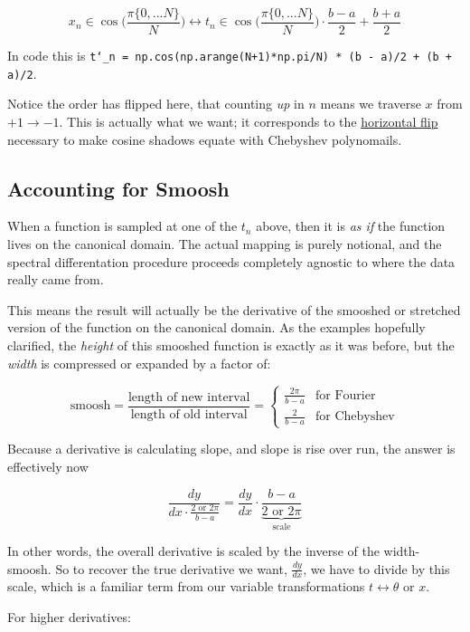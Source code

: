 \documentclass[10pt]{article}
\begin{document}
$$x_n \in \cos\!\Big(\frac{\pi \{0, ... N\}}{N}\Big) \leftrightarrow t_n \in \cos\!\Big(\frac{\pi \{0, ... N\}}{N}\Big) \cdot \frac{b - a}{2} + \frac{b + a}{2}$$

\noindent In code this is \texttt{t\char`_n = np.cos(np.arange(N+1)*np.pi/N) * (b - a)/2 + (b + a)/2}.

Notice the order has flipped here, that counting \textit{up} in $n$ means we traverse $x$ from $+1 \rightarrow -1$. This is actually what we want; it corresponds to the \hyperref[cylinder]{horizontal flip} necessary to make cosine shadows equate with Chebyshev polynomails.

\subsection{Accounting for Smoosh}

When a function is sampled at one of the $t_n$ above, then it is \textit{as if} the function lives on the canonical domain. The actual mapping is purely notional, and the spectral differentation procedure proceeds completely agnostic to where the data really came from.

This means the result will actually be the derivative of the smooshed or stretched version of the function on the canonical domain. As the examples hopefully clarified, the \textit{height} of this smooshed function is exactly as it was before, but the \textit{width} is compressed or expanded by a factor of:

$$\text{smoosh} = \frac{\text{length of new interval}}{\text{length of old interval}} = \begin{cases} \frac{2\pi}{b-a} & \text{for Fourier} \\ \frac{2}{b-a} & \text{for Chebyshev} \end{cases}$$

Because a derivative is calculating slope, and slope is rise over run, the answer is effectively now

$$\frac{dy}{dx \cdot \frac{2 \text{ or } 2\pi}{b-a}} = \frac{dy}{dx} \cdot \underbrace{\frac{b-a}{2 \text{ or } 2\pi}}_{\text{scale}}$$

In other words, the overall derivative is scaled by the inverse of the width-smoosh. So to recover the true derivative we want, $\frac{dy}{dx}$, we have to divide by this scale, which is a familiar term from our variable transformations $t \leftrightarrow \theta \text{ or } x$.

For higher derivatives:
\end{document}
